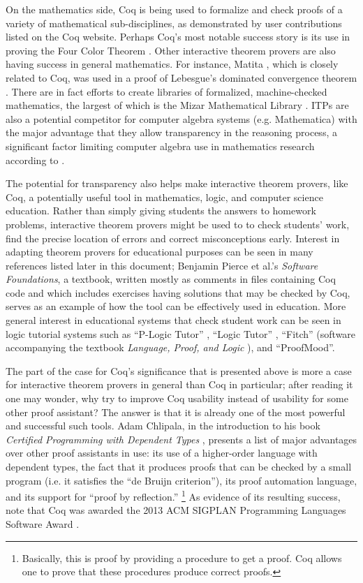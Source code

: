 \documentclass[11pt]{amsart}
\begin{document}
On the mathematics side, Coq is being used to formalize and check proofs of a variety of mathematical sub-disciplines, as demonstrated by user contributions listed on the Coq website.  Perhaps Coq's most notable success story is its use in proving the Four Color Theorem \cite{gonthier2005computer}.  Other interactive theorem provers are also having success in general mathematics.  For instance, Matita \cite{Matita}, which is closely related to Coq, was used in a proof of Lebesgue's dominated convergence theorem \cite{coen2008constructive}.  There are in fact efforts to create libraries of formalized, machine-checked mathematics, the largest of which is the Mizar Mathematical Library \cite{geuvers2009proof}.  ITPs are also a potential competitor for computer algebra systems (e.g. Mathematica) with the major advantage that they allow transparency in the reasoning process, a significant factor limiting computer algebra use in mathematics research according to \cite{bunt2009friend}.

The potential for transparency also helps make interactive theorem provers, like Coq, a potentially useful tool in mathematics, logic, and computer science education.  Rather than simply giving students the answers to homework problems, interactive theorem provers might be used to to check students' work, find the precise location of errors and correct misconceptions early.  Interest in adapting theorem provers for educational purposes can be seen in many references listed later in this document; Benjamin Pierce et al.'s \textit{Software Foundations}\cite{pierce2010software}, a textbook, written mostly as comments in files containing Coq code and which includes exercises having solutions that may be checked by Coq, serves as an example of how the tool can be effectively used in education.  More general interest in educational systems that check student work can be seen in logic tutorial systems such as ``P-Logic Tutor'' \cite{lukins2002tutorial}, ``Logic Tutor'' \cite{lesta2002intelligent}, ``Fitch'' (software accompanying the textbook \textit{Language, Proof, and Logic} \cite{barwise2000language}), and ``ProofMood''\cite{ProofMood}.

The part of the case for Coq's significance that is presented above is more a case for interactive theorem provers in general than Coq in particular; after reading it one may wonder, why try to improve Coq usability instead of usability for some other proof assistant?  The answer is that it is already one of the most powerful and successful such tools.  Adam Chlipala, in the introduction to his book \textit{Certified Programming with Dependent Types} \cite{chlipala2011certified}, presents a list of major advantages over other proof assistants in use:  its use of a higher-order language with dependent types, the fact that it produces proofs that can be checked by a small program (i.e. it satisfies the ``de Bruijn criterion''), its proof automation language, and its support for ``proof by reflection.''
\footnote{Basically, this is proof by providing a procedure to get a proof.  Coq allows one to prove that these procedures produce correct proofs.}  As evidence of its resulting success, note that Coq was awarded the 2013 ACM SIGPLAN Programming Languages Software Award \cite{CoqSIGPLANAward}.
\end{document}
